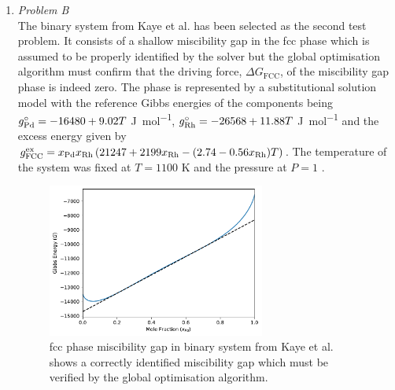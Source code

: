 \begin{enumerate}
	
	\item	\emph{Problem B}\\
		The binary   system from Kaye et al. \cite{Kaye07} has been selected as the second test problem. It consists of a shallow miscibility gap in the \gls{fcc} phase which is assumed to be properly identified by the solver but the global optimisation algorithm must confirm that the driving force, $\Delta G_\text{FCC}$, of the miscibility gap phase is indeed zero. The phase is represented by a substitutional solution model with the reference Gibbs energies of the components being $g_{\ce{Pd}}^\circ = -16480 + 9.02T$ \si{\joule \per \mole}, $g_{\ce{Rh}}^\circ = -26568 + 11.88 T$ \si{\joule \per \mole} and the excess energy given by $g_\text{FCC}^\text{ex} = x_{\ce{Pd}}x_{\ce{Rh}} \left(21247 + 2199 x_{\ce{Rh}} - (2.74 - 0.56x_{\ce{Rh}})T\right)$. The temperature of the system was fixed at $T = 1100$ \si{\kelvin} and the pressure at $P=1$ \si{\atmosphere}.
		\begin{figure}[htbp]			
			\centering
			\includegraphics[width=0.675\textwidth]{figures/chapter-6/System_PdRh.pdf}
			\caption[Global optimisation test problem B: FCC phase miscibility gap in  binary system.]{\gls{fcc} phase miscibility gap in  binary system from Kaye et al. \cite{Kaye07} shows a correctly identified miscibility gap which must be verified by the global optimisation algorithm.}
			\label{fig:testB}
		\end{figure}


\end{enumerate}
